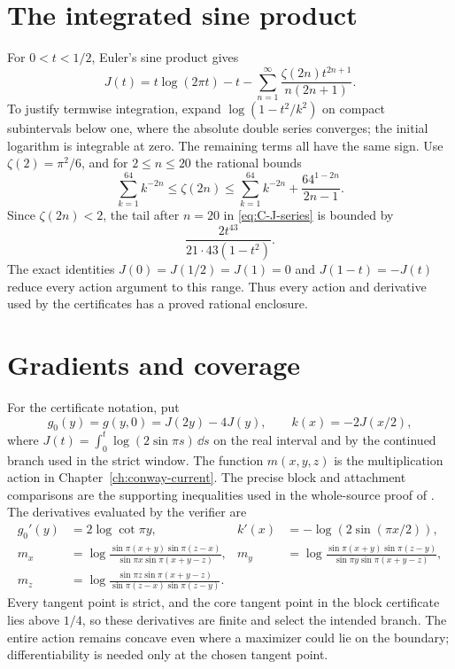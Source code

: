 \section{The integrated sine product}
For $0<t<1/2$, Euler's sine product gives
\begin{equation}\label{eq:C-J-series}
 J(t)=t\log(2\pi t)-t
 -\sum_{n=1}^{\infty}\frac{\zeta(2n)t^{2n+1}}{n(2n+1)}.
\end{equation}
To justify termwise integration, expand $\log(1-t^2/k^2)$ on compact subintervals below one, where the absolute double series converges; the initial logarithm is integrable at zero. The remaining terms all have the same sign. Use $\zeta(2)=\pi^2/6$, and for $2\le n\le20$ the rational bounds
\[
 \sum_{k=1}^{64}k^{-2n}\le\zeta(2n)
 \le\sum_{k=1}^{64}k^{-2n}+\frac{64^{1-2n}}{2n-1}.
\]
Since $\zeta(2n)<2$, the tail after $n=20$ in \eqref{eq:C-J-series} is bounded by
\[
 \frac{2t^{43}}{21\cdot43(1-t^2)}.
\]
The exact identities $J(0)=J(1/2)=J(1)=0$ and $J(1-t)=-J(t)$ reduce every action argument to this range. Thus every action and derivative used by the certificates has a proved rational enclosure.

\section{Gradients and coverage}
For the certificate notation, put
\[
 g_0(y)=g(y,0)=J(2y)-4J(y),\qquad k(x)=-2J(x/2),
\]
where $J(t)=\int_0^t\log(2\sin\pi s)\,\dd s$ on the real
interval and by the continued branch used in the strict window.
The function $m(x,y,z)$ is the multiplication action in
Chapter~\ref{ch:conway-current}. The precise block and attachment
comparisons are the supporting inequalities used in the
whole-source proof of \cite{Bounds}.
The derivatives evaluated by the verifier are
\begin{align*}
 g_0'(y)&=2\log\cot\pi y,& k'(x)&=-\log(2\sin(\pi x/2)),\\
 m_x&=\log\frac{\sin\pi(x+y)\sin\pi(z-x)}{\sin\pi x\sin\pi(x+y-z)},&
 m_y&=\log\frac{\sin\pi(x+y)\sin\pi(z-y)}{\sin\pi y\sin\pi(x+y-z)},\\
 m_z&=\log\frac{\sin\pi z\sin\pi(x+y-z)}{\sin\pi(z-x)\sin\pi(z-y)}.
\end{align*}
Every tangent point is strict, and the core tangent point in the block certificate lies above $1/4$, so these derivatives are finite and select the intended branch. The entire action remains concave even where a maximizer could lie on the boundary; differentiability is needed only at the chosen tangent point.

